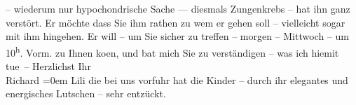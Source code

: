 \begin{ledgroupsized}[t]{13cm}
               – wiederum nur hypochondrische Sache — diesmals Zungenkrebs – hat ihn ganz verstört.
               Er möchte dass Sie ihm rathen zu {\pb}wem er gehen soll – vielleicht sogar mit ihm hingehen. Er will – um Sie sicher zu
               treffen – morgen – Mittwoch – um 10\textsuperscript{h}.
                  Vorm. zu Ihnen ko{\geminationm}en, und bat mich Sie zu
               verständigen – was {\pb}ich hiemit
               tue –\pend
           \pstart
           Herzlichst Ihr{\\[\baselineskip]}\spacefill\mbox{Richard}\pend
           \leftskip=0em{}\pstart
           \noindent{}Lili die bei uns vorfuhr hat die Kinder – durch
                  ihr elegantes und energisches Lutschen – sehr entzückt.\pend
                     \endnumbering{}\end{ledgroupsized}  \newcommand{\dateiname}{L01890}\newcommand{\titel}{Richard Beer-Hofmann an Arthur Schnitzler, 30. 11. 1909}\newcommand{\editorInnen}{Martin Anton Müller und Gerd-Hermann Susen}
            \footnotesize
\begin{ledgroupsized}[t]{11.5cm}
\end{ledgroupsized}
         
      